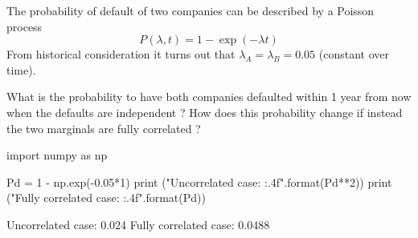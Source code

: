 \documentclass[12pt,a4paper]{exam}
\begin{document}
\begin{questions}
\question The probability of default of two companies can be described by a Poisson process 
\begin{equation*}
P(\lambda, t) = 1 - \exp(-\lambda t)
\end{equation*}
From historical consideration it turns out that $\lambda_A = \lambda_B = 0.05$ (constant over time). 

What is the probability to have both companies defaulted within 1 year from now when the defaults are independent ?
How does this probability change if instead the two marginals are fully correlated ?

\makeemptybox{1.5 cm}

\begin{solution}
\begin{ipython}
import numpy as np

Pd = 1 - np.exp(-0.05*1)
print ("Uncorrelated case: {:.4f}".format(Pd**2))
print ("Fully correlated case: {:.4f}".format(Pd))
\end{ipython}
\begin{ioutput}
Uncorrelated case: 0.024
Fully correlated case: 0.0488
\end{ioutput}
\end{solution}

\end{questions}
\end{document}
